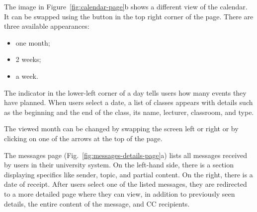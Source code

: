 The image in Figure~\ref{fig:calendar-page}b shows a different view of the calendar. It can be swapped using the button in the top right corner of the page. There are three available appearances:
\begin{itemize}
    \item one month;
    \item 2 weeks;
    \item a week.
\end{itemize}
 
The indicator in the lower-left corner of a day tells users how many events they have planned. When users select a date, a list of classes appears with details such as the beginning and the end of the class, its name, lecturer, classroom, and type.

The viewed month can be changed by swapping the screen left or right or by clicking on one of the arrows at the top of the page.


The messages page (Fig.~\ref{fig:messages-details-page}a) lists all messages received by users in their university system. On the left-hand side, there is a section displaying specifics like sender, topic, and partial content. On the right, there is a date of receipt. After users select one of the listed messages, they are redirected to a more detailed page where they can view, in addition to previously seen details, the entire content of the message, and CC recipients.

